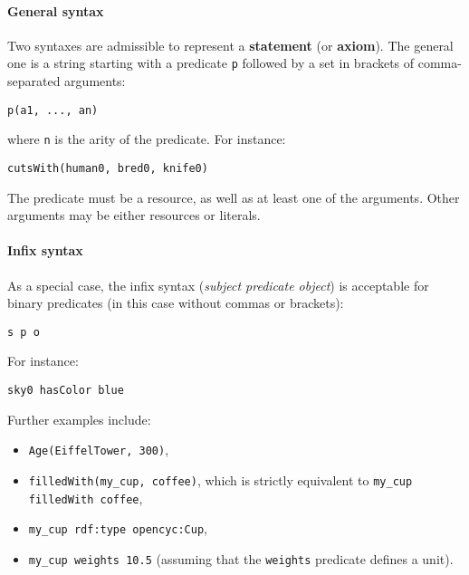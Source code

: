 \paragraph{General syntax}

Two syntaxes are admissible to represent a \textbf{statement} (or
\textbf{axiom}).  The general one is a string starting with a predicate
\texttt{p} followed by a set in brackets of comma-separated arguments:

    \begin{center} \tt p(a1, ..., an) \end{center}

where \texttt{n} is the arity of the predicate. For instance:

    \begin{center}  \tt cutsWith(human0, bred0, knife0) \end{center}

The predicate must be a resource, as well as at least one of the arguments.
Other arguments may be either resources or literals.

\paragraph{Infix syntax}

As a special case, the infix syntax (\emph{subject predicate object}) is
acceptable for binary predicates (in this case without commas or brackets):

    \begin{center} \tt s p o \end{center}

For instance:

    \begin{center} \tt sky0 hasColor blue \end{center}


Further examples include:

\begin{itemize}
    \item {\tt Age(EiffelTower, 300)},

    \item {\tt filledWith(my\_cup, coffee)}, which is strictly equivalent to
    {\tt my\_cup filledWith coffee},

    \item {\tt my\_cup rdf:type opencyc:Cup},

    \item {\tt my\_cup weights 10.5} (assuming that the {\tt weights} predicate
    defines a unit).

\end{itemize}

